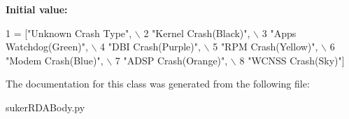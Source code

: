 {\bfseries Initial value\+:}
\begin{DoxyCode}
1 = [\textcolor{stringliteral}{"Unknown Crash Type"}, \(\backslash\)
2                      \textcolor{stringliteral}{"Kernel Crash(Black)"}, \(\backslash\)
3                      \textcolor{stringliteral}{"Apps Watchdog(Green)"}, \(\backslash\)
4                      \textcolor{stringliteral}{"DBI Crash(Purple)"}, \(\backslash\)
5                      \textcolor{stringliteral}{"RPM Crash(Yellow)"}, \(\backslash\)
6                      \textcolor{stringliteral}{"Modem Crash(Blue)"}, \(\backslash\)
7                      \textcolor{stringliteral}{"ADSP Crash(Orange)"}, \(\backslash\)
8                      \textcolor{stringliteral}{"WCNSS Crash(Sky)"}]
\end{DoxyCode}


The documentation for this class was generated from the following file\+:\begin{DoxyCompactItemize}
\item 
suker\+R\+D\+A\+Body.\+py\end{DoxyCompactItemize}
